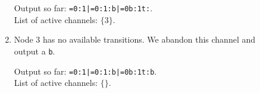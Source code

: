 \begin{example}[Protocol]
\begin{description}
\begin{enumerate}
        Output so far: \texttt{=0:1|=0:1:b|=0b:1t:}. \\
        List of active channels: $\{3\}$.
      \item Node 3 has no available transitions. We abandon this
        channel and output a \texttt{b}.

        Output so far: \texttt{=0:1|=0:1:b|=0b:1t:b}. \\
        List of active channels: $\{\}$.
    \end{enumerate}
  \end{description}
\end{example}


